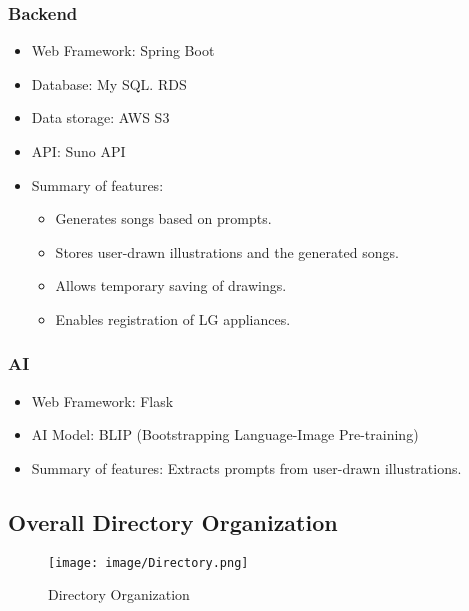 \documentclass[conference]{IEEEtran}
\begin{document}
 \subsubsection{Backend}
\begin{itemize}
    \item Web Framework: Spring Boot\\
    \item Database: My SQL. RDS\\
    \item Data storage: AWS S3\\
    \item API: Suno API\\
    \item Summary of features:
\begin{itemize}
    \item Generates songs based on prompts.\\
    \item Stores user-drawn illustrations and the generated songs.\\
    \item Allows temporary saving of drawings.\\
    \item Enables registration of LG appliances.\\
\end{itemize}
\end{itemize}

\subsubsection{AI}
\begin{itemize}
    \item Web Framework: Flask\\
    \item AI Model: BLIP (Bootstrapping Language-Image Pre-training)\\
    \item Summary of features: Extracts prompts from user-drawn illustrations.
\end{itemize}


\clearpage





\subsection{Overall Directory Organization}

\begin{figure}[h!]
    \centering
    \texttt{[image: image/Directory.png]}
    \caption{Directory Organization}
    \label{fig:enter-label}
\end{figure}
\end{document}
